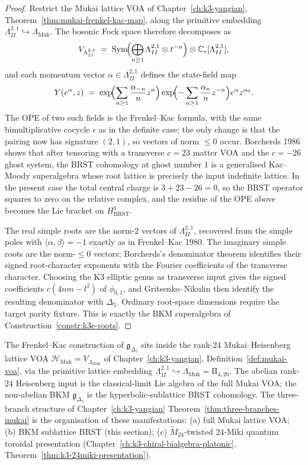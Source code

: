 \begin{proof}
Restrict the Mukai lattice VOA of Chapter~\ref{ch:k3-yangian},
Theorem~\ref{thm:mukai-frenkel-kac-map}, along the primitive embedding
$\Lambda^{2,1}_{II}\hookrightarrow\Lambda_{\mathrm{Muk}}$. The bosonic Fock space
therefore decomposes as
\[
 V_{\Lambda^{2,1}_{II}}
 \;=\;
 \mathrm{Sym}\!\Bigl(\bigoplus_{n\geq 1}\Lambda^{2,1}_{II}\otimes t^{-n}\Bigr)
 \otimes
 \mathbb{C}_\epsilon[\Lambda^{2,1}_{II}],
\]
and each momentum vector $\alpha\in\Lambda^{2,1}_{II}$ defines the state-field map
\[
 Y(e^\alpha,z)
 \;=\;
 \exp\!\Bigl(\sum_{n\geq 1}\frac{\alpha_{-n}}{n}z^n\Bigr)
 \exp\!\Bigl(-\sum_{n\geq 1}\frac{\alpha_n}{n}z^{-n}\Bigr)e^\alpha z^{\alpha_0}.
\]
The OPE of two such fields is the Frenkel--Kac formula, with the same bimultiplicative
cocycle $\epsilon$ as in the definite case; the only change is that the pairing now has
signature $(2,1)$, so vectors of norm $\leq 0$ occur. Borcherds 1986 shows that after
tensoring with a transverse $c = 23$ matter VOA and the $c = -26$ ghost system, the
BRST cohomology at ghost number $1$ is a generalised Kac--Moody superalgebra whose
root lattice is precisely the input indefinite lattice. In the present case the total
central charge is $3 + 23 - 26 = 0$, so the BRST operator squares to zero on the
relative complex, and the residue of the OPE above becomes the Lie bracket on
$H^1_{\mathrm{BRST}}$.

The real simple roots are the norm-$2$ vectors of $\Lambda^{2,1}_{II}$, recovered from
the simple poles with $\langle\alpha,\beta\rangle=-1$ exactly as in Frenkel--Kac 1980.
The imaginary simple roots are the norm-$\leq 0$ vectors; Borcherds's denominator
theorem identifies their signed root-character exponents with the Fourier
coefficients of the transverse character. Choosing the K3 elliptic genus as
transverse input gives the signed coefficients \(c(4nm-l^2)\) of
\(\phi_{0,1}\), and Gritsenko--Nikulin then identify the resulting
denominator with $\Delta_5$. Ordinary root-space dimensions require the
target parity fixture. This is exactly the BKM superalgebra of
Construction~\ref{constr:k3e-roots}.
\end{proof}

\begin{remark}
\label{rem:k3e-mukai-heisenberg-ambient}
The Frenkel--Kac construction of $\mathfrak{g}_{\Delta_5}$ sits inside the
rank-$24$ Mukai--Heisenberg lattice VOA
$\mathcal{H}_{\mathrm{Muk}} = V_{\Lambda_{\mathrm{Muk}}}$ of
Chapter~\ref{ch:k3-yangian}, Definition~\ref{def:mukai-voa}, via the primitive
lattice embedding
$\Lambda^{2,1}_{II}\hookrightarrow\Lambda_{\mathrm{Muk}} = \mathrm{II}_{4,20}$.
The abelian rank-$24$ Heisenberg input is the classical-limit Lie algebra of
the full Mukai VOA; the non-abelian BKM $\mathfrak{g}_{\Delta_5}$ is the
hyperbolic-sublattice BRST cohomology. The three-branch structure of
Chapter~\ref{ch:k3-yangian} Theorem~\ref{thm:three-branches-mukai} is the
organisation of these manifestations: (a) full Mukai lattice VOA; (b) BKM
sublattice BRST (this section); (c) $\widetilde{M}_{24}$-twisted
$24$-Miki quantum toroidal presentation
(Chapter~\ref{ch:k3-chiral-bialgebra-platonic},
Theorem~\ref{thm:k3-24miki-presentation}).
\end{remark}

